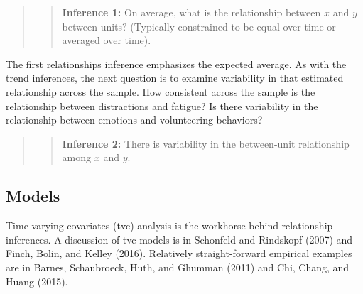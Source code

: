 \documentclass[english,,man]{apa6}
\begin{document}
\begin{quote}
\begin{quote}
\textbf{Inference 1:} On average, what is the relationship between \(x\) and \(y\) between-units? (Typically constrained to be equal over time or averaged over time).
\end{quote}
\end{quote}

The first relationships inference emphasizes the expected average. As with the trend inferences, the next question is to examine variability in that estimated relationship across the sample. How consistent across the sample is the relationship between distractions and fatigue? Is there variability in the relationship between emotions and volunteering behaviors?

\begin{quote}
\begin{quote}
\textbf{Inference 2:} There is variability in the between-unit relationship among \(x\) and \(y\).
\end{quote}
\end{quote}

\hypertarget{models-1}{%
\subsection{Models}\label{models-1}}

Time-varying covariates (tvc) analysis is the workhorse behind relationship inferences. A discussion of tvc models is in Schonfeld and Rindskopf (2007) and Finch, Bolin, and Kelley (2016). Relatively straight-forward empirical examples are in Barnes, Schaubroeck, Huth, and Ghumman (2011) and Chi, Chang, and Huang (2015).
\end{document}
